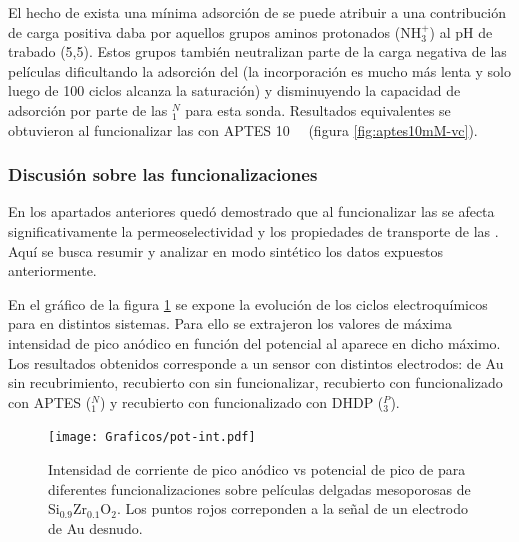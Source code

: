 			El hecho de exista una mínima adsorción de \fe\space se puede atribuir a una contribución de carga positiva daba por aquellos grupos aminos protonados (NH$_3^+$) al pH de trabado (5,5). Estos grupos también neutralizan parte de la carga negativa de las películas dificultando la adsorción del \ru\space (la incorporación es mucho más lenta y solo luego de 100 ciclos alcanza la saturación) y disminuyendo la capacidad de adsorción por parte de las \pdmZ$^N_{1}$ para esta sonda. Resultados equivalentes se obtuvieron al funcionalizar las \pdmZ\space con APTES \SI{10}{\milli\Molar} (figura \ref{fig:aptes10mM-vc}).

	 	\subsubsection{Discusión sobre las funcionalizaciones}

	 	 En los apartados anteriores quedó demostrado que al funcionalizar las \pdmZ\space se afecta significativamente la permeoselectividad y los propiedades de transporte de las \pdm. Aquí se busca resumir y analizar en modo sintético los datos expuestos anteriormente. 

	 	 En el gráfico de la figura \ref{fig:pot-int} se expone la evolución de los ciclos electroquímicos para \ru\space en distintos sistemas. Para ello se extrajeron los valores de máxima intensidad de pico anódico en función del potencial al aparece en dicho máximo. Los resultados obtenidos corresponde a un sensor con distintos electrodos: de Au sin recubrimiento, recubierto con \pdmZ\space sin funcionalizar, recubierto con \pdmZ\space funcionalizado con APTES (\pdmZ$^N_1$) y recubierto con \pdmZ\space funcionalizado con DHDP (\pdmZ$^P_3$).

	 			 \begin{figure}[ht!]	
					\centering
			 	    \texttt{[image: Graficos/pot-int.pdf]}
			        \caption[Evolución de la señal de \ru\space para distintos sistemas]{Intensidad de corriente de pico anódico vs potencial de pico de \aminorutenio\space para diferentes funcionalizaciones sobre películas delgadas mesoporosas de Si$_{0.9}$Zr$_{0.1}$O$_2$. Los puntos rojos correponden a la señal de un electrodo de Au desnudo.}
			        \label{fig:pot-int}
			      	\end{figure}


